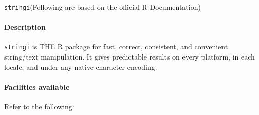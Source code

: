 \documentclass[
]{article}
\begin{document}
\texttt{stringi}(Following are based on the official R Documentation)

\hypertarget{description}{%
\paragraph{\texorpdfstring{\textbf{Description}}{Description}}\label{description}}

\texttt{stringi} is THE R package for fast, correct, consistent, and
convenient string/text manipulation. It gives predictable results on
every platform, in each locale, and under any native character encoding.

\hypertarget{facilities-available}{%
\paragraph{\texorpdfstring{\textbf{Facilities
available}}{Facilities available}}\label{facilities-available}}

Refer to the following:
\end{document}
